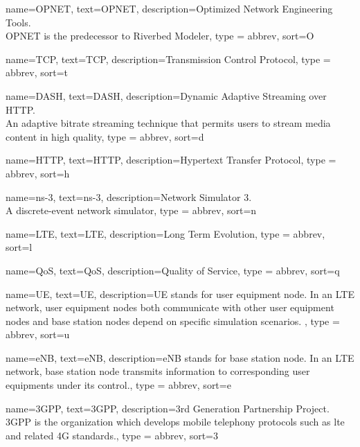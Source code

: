 

\makeglossaries

%
{%
	name={OPNET},
	text={OPNET},
	description={Optimized Network Engineering Tools.\\OPNET is the predecessor to Riverbed Modeler},
	type = {abbrev},
	sort={O}
}

%
{%
	name={TCP},
	text={TCP},
	description={Transmission Control Protocol},
	type = {abbrev},
	sort={t}
}

%
{%
	name={DASH},
	text={DASH},
	description={Dynamic Adaptive Streaming over \gls{HTTP}. \\An adaptive bitrate streaming technique that permits users to stream media content in high quality},
	type = {abbrev},
	sort={d}
}

%
{%
	name={HTTP},
	text={HTTP},
	description={Hypertext Transfer Protocol},
	type = {abbrev},
	sort={h}
}

%
{%
	name={ns-3},
	text={ns-3},
	description={Network Simulator 3.\\ A discrete-event network simulator},
	type = {abbrev},
	sort={n}
}

%
{%
	name={LTE},
	text={LTE},
	description={Long Term Evolution},
	type = {abbrev},
	sort={l}
}

%
{%
	name={QoS},
	text={QoS},
	description={Quality of Service},
	type = {abbrev},
	sort={q}
}

%
{%
	name={UE},
	text={UE},
	description={UE stands for user equipment node. In an LTE network, user equipment nodes both communicate with other user equipment nodes and base station nodes depend on specific simulation scenarios. },
	type = {abbrev},
	sort={u}
}

%
{%
	name={eNB},
	text={eNB},
	description={eNB stands for base station node. In an LTE network, base station node transmits information to corresponding user equipments under its control.},
	type = {abbrev},
	sort={e}
}

%
{%
	name={3GPP},
	text={3GPP},
	description={3rd Generation Partnership Project. 3GPP is the organization which develops mobile telephony protocols such as \gls{lte} and related 4G standards.},
	type = {abbrev},
	sort={3}
}

